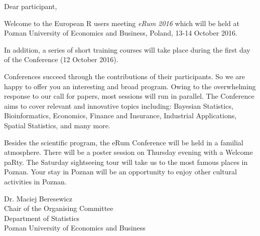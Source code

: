 \Large
\raggedright Dear participant,

Welcome to the European R users meeting \textit{eRum 2016} which will be held at Poznan University of Economics and Business, Poland, 13-14 October 2016.

In addition, a series of short training courses will take place during the first day of the Conference (12 October 2016).

Conferences succeed through the contributions of their participants. So we are happy to offer you an interesting and broad program. Owing to the overwhelming response to our call for papers, most sessions will run in parallel. The Conference aims to cover relevant and innovative topics including: Bayesian Statistics, Bioinformatics, Economics, Finance and Insurance, Industrial Applications, Spatial Statistics, and many more.

Besides the scientific program, the eRum Conference will be held in a familial atmosphere. There will be a poster session on Thursday evening with a Welcome paRty. The Saturday sightseeing tour will take us to the most famous places in Poznan. Your stay in Poznan will be an opportunity to enjoy other cultural activities in Poznan.

\vspace{1.5cm}

\begin{flushleft}
Dr. Maciej Beresewicz \\
\vspace{0.5cm}
Chair of the Organising Committee \\ 
Department of Statistics \\ 
Poznan University of Economics and Business
\end{flushleft}
